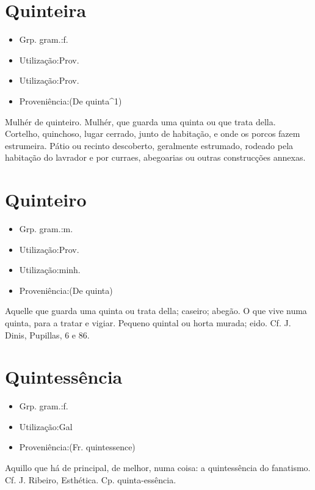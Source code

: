 \section{Quinteira}
\begin{itemize}
\item {Grp. gram.:f.}
\end{itemize}
\begin{itemize}
\item {Utilização:Prov.}
\end{itemize}
\begin{itemize}
\item {Utilização:Prov.}
\end{itemize}
\begin{itemize}
\item {Proveniência:(De \textunderscore quinta\textunderscore ^1)}
\end{itemize}
Mulhér de quinteiro.
Mulhér, que guarda uma quinta ou que trata della.
Cortelho, quinchoso, lugar cerrado, junto de habitação, e onde os porcos fazem estrumeira.
Pátio ou recinto descoberto, geralmente estrumado, rodeado pela habitação do lavrador e por curraes, abegoarias ou outras construcções annexas.
\section{Quinteiro}
\begin{itemize}
\item {Grp. gram.:m.}
\end{itemize}
\begin{itemize}
\item {Utilização:Prov.}
\end{itemize}
\begin{itemize}
\item {Utilização:minh.}
\end{itemize}
\begin{itemize}
\item {Proveniência:(De \textunderscore quinta\textunderscore )}
\end{itemize}
Aquelle que guarda uma quinta ou trata della; caseiro; abegão.
O que vive numa quinta, para a tratar e vigiar.
Pequeno quintal ou horta murada; eido. Cf. J. Dinis, \textunderscore Pupillas\textunderscore , 6 e 86.
\section{Quintessência}
\begin{itemize}
\item {Grp. gram.:f.}
\end{itemize}
\begin{itemize}
\item {Utilização:Gal}
\end{itemize}
\begin{itemize}
\item {Proveniência:(Fr. \textunderscore quintessence\textunderscore )}
\end{itemize}
Aquillo que há de principal, de melhor, numa coisa: \textunderscore a quintessência do fanatismo\textunderscore . Cf. J. Ribeiro, \textunderscore Esthética\textunderscore .
Cp. \textunderscore quinta-essência\textunderscore .
